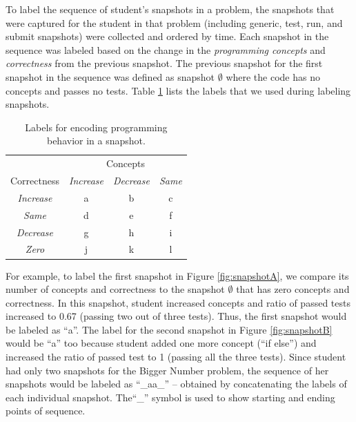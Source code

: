 \documentclass{sigchi}
\begin{document}
To label the sequence of student's snapshots in a problem, the snapshots that were captured for the student in that problem (including generic, test, run, and submit snapshots) were collected and ordered by time. Each snapshot in the sequence was labeled based on the change in the \textit{programming concepts} and \textit{correctness} from the previous snapshot. The previous snapshot for the first snapshot in the sequence was defined as snapshot $\emptyset$ where the code has no concepts and passes no tests.  Table \ref{table:labels} lists the labels that we used during labeling snapshots. \vspace{-5pt}

\begin{table}[thb]
\centering
\begin{tabular}{cccc}
 & \multicolumn{3}{c}{\small{Concepts}} \\ \cmidrule{2-4} 
\small{Correctness} & \small\textit{Increase} & \small\textit{Decrease} & \small\textit{Same} \\ \midrule
\small\textit{Increase} & a & b & c \\
\small\textit{Same} & d & e & f \\
\small\textit{Decrease} & g & h & i \\
\small\textit{Zero} & j & k & l \\ 
\end{tabular}
\caption{Labels for encoding programming behavior in a snapshot.}\vspace{-5pt}
\label{table:labels}
\end{table}

For example, to label the first snapshot in Figure \ref{fig:snapshotA}, we compare its number of concepts and correctness to the snapshot $\emptyset$ that has zero concepts and correctness. In this snapshot, student increased concepts and ratio of passed tests increased to 0.67 (passing two out of three tests). Thus, the first snapshot would be labeled as ``a''. The label for the second snapshot in Figure \ref{fig:snapshotB} would be ``a'' too because student added one more concept (``if else'') and increased the ratio of passed test to 1 (passing all the three tests). Since student had only two snapshots for the Bigger Number problem, the sequence of her snapshots would be labeled as ``{\_}aa{\_}'' -- obtained by concatenating the labels of each individual snapshot. The``{\_}'' symbol is used to show starting and ending points of sequence. 
\end{document}
